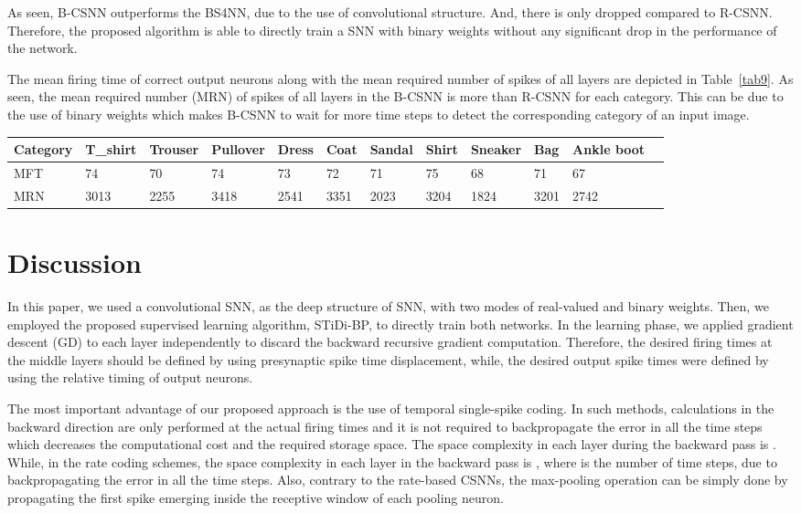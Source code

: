 \documentclass[preprint,twocolumn,5p,12pt]{article}
\begin{document}
As seen, B-CSNN outperforms the BS4NN, due to the use of convolutional structure. And, there is only  dropped compared to R-CSNN. 
Therefore, the proposed algorithm is able to directly train a SNN with binary weights without any significant drop in the performance of the network.

The mean firing time of correct output neurons along with the mean required number of spikes of all layers are depicted in Table~\ref{tab9}.
As seen, the mean required number (MRN) of spikes of all layers in the B-CSNN is more than R-CSNN for each category. This can be due to the use of binary weights which makes B-CSNN to wait for more time steps to detect the corresponding category of an input image.

\begin{table*}
\begin{center}
\caption{The mean firing time (MFT) of the correct output neuron and the mean required number (MRN) of spikes in all the layers for each category of Fashion-MNIST in B-CSNN.}  \label{tab9}
\begin{tabular}{lllllllllllc}
\scriptsize
Category & T\_shirt & Trouser &  Pullover & Dress & Coat & Sandal & Shirt & Sneaker & Bag & Ankle boot \\
\hline
MFT & 74 & 70 & 74 & 73 & 72 & 71 & 75 & 68 & 71 & 67 \\
MRN & 3013 & 2255 & 3418 & 2541 & 3351 & 2023 & 3204 & 1824 & 3201 & 2742 
\end{tabular}
\end{center}
\end{table*}

\section{Discussion}
In this paper, we used a convolutional SNN, as the deep structure of SNN, with two modes of real-valued and binary weights. Then, we employed the proposed supervised learning algorithm, STiDi-BP, to directly train both networks. 
In the learning phase, we applied gradient descent (GD) to each layer independently to discard the backward recursive gradient computation. 
Therefore, the desired firing times at the middle layers should be defined by using presynaptic spike time displacement, while, the desired output spike times were defined by using the relative timing of output neurons.

The most important advantage of our proposed approach is the use of temporal single-spike coding. In such methods, calculations in the backward direction are only performed at the actual firing times and it is not required to backpropagate the error in all the time steps which decreases the computational cost and the required storage space.
The space complexity in each layer during the backward pass is . While, in the rate coding schemes, the space complexity in each layer in the backward pass is , where  is the number of time steps, due to backpropagating the error in all the time steps.
Also, contrary to the rate-based CSNNs, the max-pooling operation can be simply done by propagating the first spike emerging inside the receptive window of each pooling neuron. 
\end{document}
